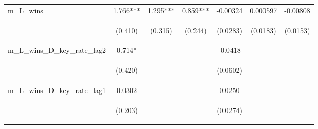 \documentclass[]{article}
\begin{document}
\begin{center}
\begin{tabular}{lcccccc}
m\_L\_wins & 1.766*** & 1.295*** & 0.859*** & -0.00324 & 0.000597 & -0.00808 \\
\vspace{4pt} & \begin{footnotesize}(0.410)\end{footnotesize} & \begin{footnotesize}(0.315)\end{footnotesize} & \begin{footnotesize}(0.244)\end{footnotesize} & \begin{footnotesize}(0.0283)\end{footnotesize} & \begin{footnotesize}(0.0183)\end{footnotesize} & \begin{footnotesize}(0.0153)\end{footnotesize} \\
m\_L\_wins\_D\_key\_rate\_lag2 & 0.714* &  &  & -0.0418 &  &  \\
\vspace{4pt} & \begin{footnotesize}(0.420)\end{footnotesize} & \begin{footnotesize}\end{footnotesize} & \begin{footnotesize}\end{footnotesize} & \begin{footnotesize}(0.0602)\end{footnotesize} & \begin{footnotesize}\end{footnotesize} & \begin{footnotesize}\end{footnotesize} \\
m\_L\_wins\_D\_key\_rate\_lag1 & 0.0302 &  &  & 0.0250 &  &  \\
\vspace{4pt} & \begin{footnotesize}(0.203)\end{footnotesize} & \begin{footnotesize}\end{footnotesize} & \begin{footnotesize}\end{footnotesize} & \begin{footnotesize}(0.0274)\end{footnotesize} & \begin{footnotesize}\end{footnotesize} & \begin{footnotesize}\end{footnotesize} \\

\end{tabular}
\end{center}
\end{document}
